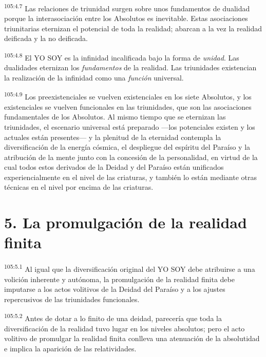 \documentclass[twoside, 11pt]{book}
\begin{document}
\par
\textsuperscript{105:4.7} Las relaciones de triunidad surgen sobre unos fundamentos de dualidad porque la interasociación entre los Absolutos es inevitable. Estas asociaciones triunitarias eternizan el potencial de toda la realidad; abarcan a la vez la realidad deificada y la no deificada.

\par
\textsuperscript{105:4.8} El YO SOY es la infinidad incalificada bajo la forma de \textit{unidad}. Las dualidades eternizan los \textit{fundamentos} de la realidad. Las triunidades existencian la realización de la infinidad como una \textit{función} universal.

\par
\textsuperscript{105:4.9} Los preexistenciales se vuelven existenciales en los siete Absolutos, y los existenciales se vuelven funcionales en las triunidades, que son las asociaciones fundamentales de los Absolutos. Al mismo tiempo que se eternizan las triunidades, el escenario universal está preparado ---los potenciales existen y los actuales están presentes--- y la plenitud de la eternidad contempla la diversificación de la energía cósmica, el despliegue del espíritu del Paraíso y la atribución de la mente junto con la concesión de la personalidad, en virtud de la cual todos estos derivados de la Deidad y del Paraíso están unificados experiencialmente en el nivel de las criaturas, y también lo están mediante otras técnicas en el nivel por encima de las criaturas.

\section*{5. La promulgación de la realidad finita}
\par
\textsuperscript{105:5.1} Al igual que la diversificación original del YO SOY debe atribuirse a una volición inherente y autónoma, la promulgación de la realidad finita debe imputarse a los actos volitivos de la Deidad del Paraíso y a los ajustes repercusivos de las triunidades funcionales.

\par
\textsuperscript{105:5.2} Antes de dotar a lo finito de una deidad, parecería que toda la diversificación de la realidad tuvo lugar en los niveles absolutos; pero el acto volitivo de promulgar la realidad finita conlleva una atenuación de la absolutidad e implica la aparición de las relatividades.
\end{document}
